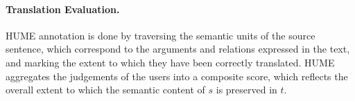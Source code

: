 \documentclass[11pt,letterpaper]{article}
\begin{document}
%
%  


\paragraph{Translation Evaluation.}
HUME annotation is done by traversing the semantic units
of the source sentence, which correspond to the arguments and relations expressed
in the text, and marking the extent to which they have been correctly translated.
HUME aggregates the judgements of the users into a composite score, 
which reflects the overall extent to which the semantic content of $s$ is preserved in $t$.
\end{document}
